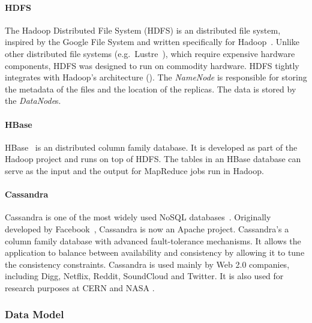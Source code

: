 
\paragraph{HDFS}

The Hadoop Distributed File System (HDFS) is an distributed file system, inspired by the Google File System and written specifically for Hadoop~\cite{Hadoop}. Unlike other distributed file systems (e.g.\ Lustre~\cite{Lustre}), which require expensive hardware components, HDFS was designed to run on commodity hardware. HDFS tightly integrates with Hadoop's architecture ().%
The \mbox{\emph{NameNode}} is responsible for storing the metadata of the files and the location of the replicas. The data is stored by the \mbox{\emph{DataNode}s}.


\paragraph{HBase} 

HBase~\cite{HBase} is an distributed column family database. It is developed as part of the Hadoop project and runs on top of HDFS. The tables in an HBase database can serve as the input and the output for MapReduce jobs run in Hadoop.

\paragraph{Cassandra}

Cassandra is one of the most widely used NoSQL databases~\cite{Cassandra}. Originally developed by Facebook~\cite{Lakshman:2010:CDS:1773912.1773922}, Cassandra is now an Apache project. 
Cassandra's a column family database with advanced fault-tolerance mechanisms. It allows the application to balance between availability and consistency by allowing it to tune the consistency constraints. Cassandra is used mainly by Web 2.0 companies, including Digg, Netflix, Reddit, SoundCloud and Twitter. It is also used for research purposes at CERN and NASA \cite{CassandraCompanies}.

\subsubsection{Data Model}

